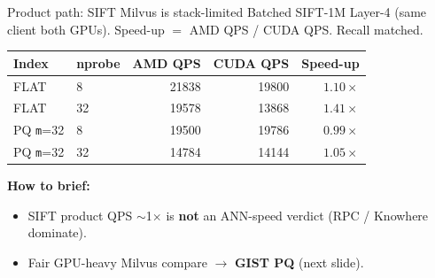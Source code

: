 \documentclass[aspectratio=169,11pt]{beamer}
\begin{document}
\begin{frame}{Product path: SIFT Milvus is stack-limited}
  \footnotesize
  Batched SIFT-1M Layer-4 (same client both GPUs).
  Speed-up $=$ AMD QPS / CUDA QPS. Recall matched.\\[0.3em]

  \begin{center}
  \begin{tabular}{@{}llrrr@{}}
    \toprule
    \textbf{Index} & \textbf{nprobe}
      & \textbf{{\color{red}AMD} QPS} & \textbf{{\color{green!60!black}CUDA} QPS} & \textbf{Speed-up} \\
    \midrule
    FLAT & 8  & 21838 & 19800 & $1.10\times$ \\
    FLAT & 32 & 19578 & 13868 & $1.41\times$ \\
    PQ \texttt{m}=32 & 8  & 19500 & 19786 & $0.99\times$ \\
    PQ \texttt{m}=32 & 32 & 14784 & 14144 & $1.05\times$ \\
    \bottomrule
  \end{tabular}
  \end{center}

  \vspace{0.45em}
  \textbf{How to brief:}
  \begin{itemize}
    \item SIFT product QPS $\sim$1$\times$ is \textbf{not} an ANN-speed verdict
          (RPC / Knowhere dominate).
    \item Fair GPU-heavy Milvus compare $\rightarrow$ \textbf{GIST PQ} (next slide).
  \end{itemize}
\end{frame}
\end{document}
